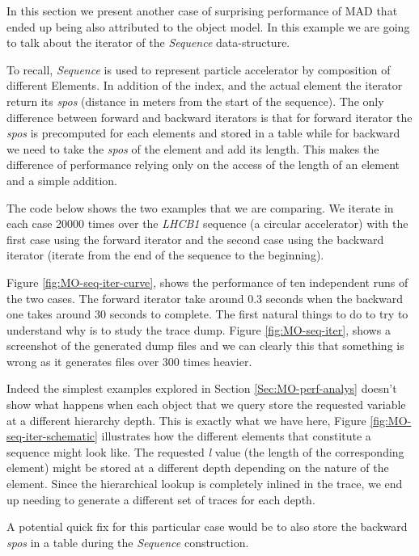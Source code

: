 
In this section we present another case of surprising performance of MAD that
ended up being also attributed to the object model. In this example we are going
to talk about the iterator of the \emph{Sequence} data-structure.

To recall,
\emph{Sequence} is used to represent particle accelerator by composition of
different Elements. In addition of the index, and the actual element the iterator
return its \emph{spos} (distance in meters from the start of the sequence). The
only difference between forward and backward iterators is that for forward iterator
the \emph{spos} is precomputed for each elements and stored in a table while for
backward we need to take the \emph{spos} of the element and add its length. This
makes the difference of performance relying only on the access of the length of
an element and a simple addition.

The code below shows the two examples that we are comparing. We iterate in each
case 20000 times over the \emph{LHCB1} sequence (a circular accelerator) with
the first case using the forward iterator and the second case using the backward
iterator (iterate from the end of the sequence to the beginning).

Figure \ref{fig:MO-seq-iter-curve}, shows the performance of ten independent
runs of the two cases. The forward iterator take around 0.3 seconds when the
backward one takes around 30 seconds to complete. The first natural things to do
to try to understand why is to study the trace dump. Figure \ref{fig:MO-seq-iter},
shows a screenshot of the generated dump files and we can clearly this that
something is wrong as it generates files over 300 times heavier.

Indeed the simplest examples explored in Section \ref{Sec:MO-perf-analys} doesn't
show what happens when each object that we query store the requested variable at
a different hierarchy depth. This is exactly what we have here, Figure
\ref{fig:MO-seq-iter-schematic} illustrates how the different elements that
constitute a sequence might look like. The requested \emph{l} value (the length
of the corresponding element) might be stored at a different depth depending on
the nature of the element. Since the hierarchical lookup is completely inlined
in the trace, we end up needing to generate a different set of traces for each
depth.

A potential quick fix for this particular case would be to also store the
backward \emph{spos} in a table during the \emph{Sequence} construction.

